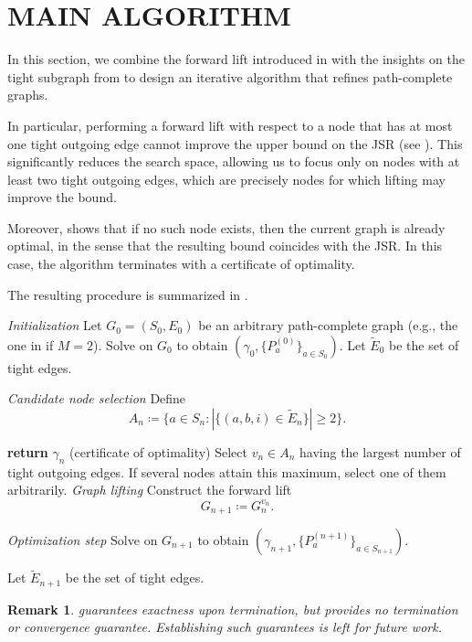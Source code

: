 \documentclass[letterpaper, 10 pt, conference]{ieeeconf}  %
\newtheorem{remark}{Remark}
\begin{document}
\section{MAIN ALGORITHM}\label{sec:algorithm}
In this section, we combine the forward lift introduced in
 with the insights on the tight subgraph from
 to design an iterative algorithm that refines
path-complete graphs.

In particular, performing a forward lift with respect to a node that
has at most one tight outgoing edge cannot improve the upper bound on the
JSR (see ). This significantly reduces the search space, allowing us to focus only on
nodes with at least two tight outgoing edges, which are precisely nodes for which lifting may improve the bound.

Moreover,  shows that if no such node exists,
then the current graph is already optimal, in the sense that the
resulting bound coincides with the JSR. In this case, the algorithm terminates with a certificate of optimality. 

The resulting procedure is summarized in .

\begin{algorithm}[h]
\caption{Optimization-Based Graph Lifting}
\label{algorithm:opti}
\begin{algorithmic}[1]

\STATE \emph{Initialization}
\STATE Let $G_0=(S_0,E_0)$ be an arbitrary path-complete graph (e.g., the one in  if $M=2$).
\STATE Solve  on $G_0$ to obtain $(\gamma_0,\{P_a^{(0)}\}_{a\in S_0})$.
\STATE Let $\tilde E_0$ be the set of tight edges.


\STATE \emph{Candidate node selection}
\STATE Define
\[
A_n \coloneqq 
\{a\in S_n : |\{(a,b,i)\in \tilde E_n\}| \ge 2 \}.
\]

\STATE \textbf{return} $\gamma_n$ \quad (certificate of optimality)
\ENDIF
\STATE Select $v_n \in A_n$ having the largest number of tight outgoing edges. If several nodes attain this maximum, select one of them arbitrarily.
\STATE \emph{Graph lifting}
\STATE Construct the forward lift
\[
G_{n+1} \coloneqq G_n^{v_n}.
\]

\STATE \emph{Optimization step}
\STATE Solve  on $G_{n+1}$ to obtain
$(\gamma_{n+1},\{P_a^{(n+1)}\}_{a\in S_{n+1}})$.

\STATE Let $\tilde E_{n+1}$ be the set of tight edges.

\ENDFOR

\end{algorithmic}
\end{algorithm}
\begin{remark}
 guarantees exactness upon termination, but provides no termination or convergence guarantee. Establishing such guarantees is left for future work.
\end{remark}
\end{document}
